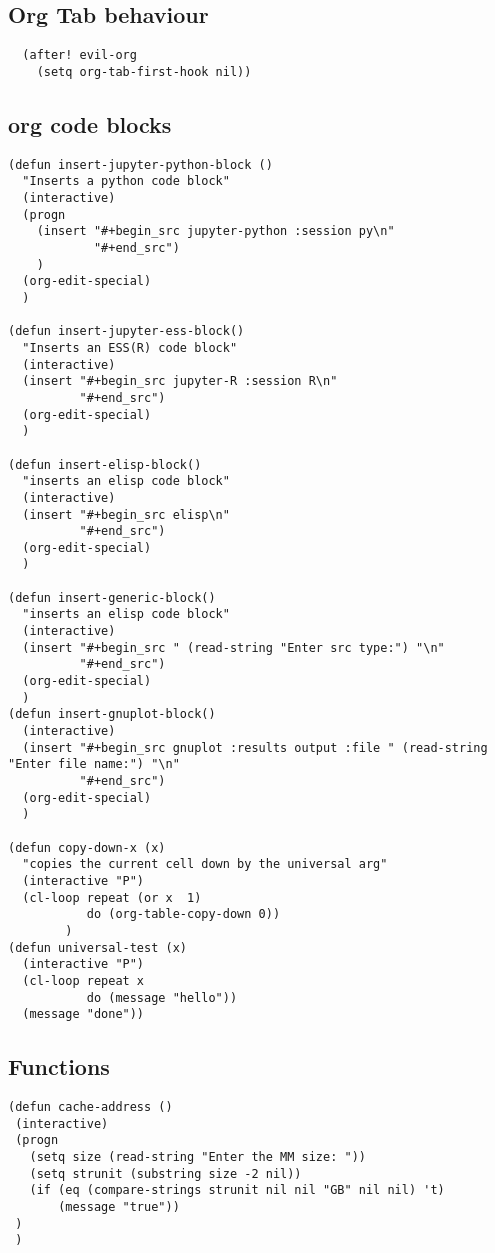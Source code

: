 \documentclass[11pt]{article}
\begin{document}
\subsection*{Org Tab behaviour}
\label{sec:org8ccac4b}
\begin{verbatim}
  (after! evil-org
    (setq org-tab-first-hook nil))
\end{verbatim}
\subsection*{org code blocks}
\label{sec:org89e475b}
\begin{verbatim}
(defun insert-jupyter-python-block ()
  "Inserts a python code block"
  (interactive)
  (progn
    (insert "#+begin_src jupyter-python :session py\n"
            "#+end_src")
    )
  (org-edit-special)
  )

(defun insert-jupyter-ess-block()
  "Inserts an ESS(R) code block"
  (interactive)
  (insert "#+begin_src jupyter-R :session R\n"
          "#+end_src")
  (org-edit-special)
  )

(defun insert-elisp-block()
  "inserts an elisp code block"
  (interactive)
  (insert "#+begin_src elisp\n"
          "#+end_src")
  (org-edit-special)
  )

(defun insert-generic-block()
  "inserts an elisp code block"
  (interactive)
  (insert "#+begin_src " (read-string "Enter src type:") "\n"
          "#+end_src")
  (org-edit-special)
  )
(defun insert-gnuplot-block()
  (interactive)
  (insert "#+begin_src gnuplot :results output :file " (read-string "Enter file name:") "\n"
          "#+end_src")
  (org-edit-special)
  )

(defun copy-down-x (x)
  "copies the current cell down by the universal arg"
  (interactive "P")
  (cl-loop repeat (or x  1)
           do (org-table-copy-down 0))
        )
(defun universal-test (x)
  (interactive "P")
  (cl-loop repeat x
           do (message "hello"))
  (message "done"))
\end{verbatim}

\subsection*{Functions}
\label{sec:orgefa17a3}
\begin{verbatim}
(defun cache-address ()
 (interactive)
 (progn
   (setq size (read-string "Enter the MM size: "))
   (setq strunit (substring size -2 nil))
   (if (eq (compare-strings strunit nil nil "GB" nil nil) 't)
       (message "true"))
 )
 )
\end{verbatim}
\end{document}
